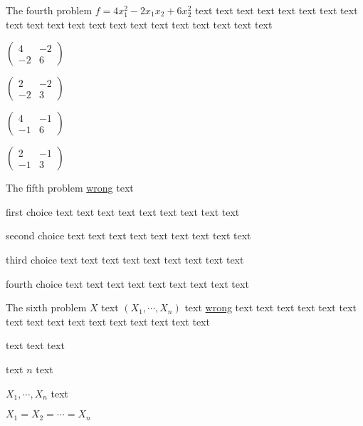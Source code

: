 \documentclass[12pt,most]{randexam}
\begin{document}
\bigskip

\begin{problem}
The fourth problem $f = 4 x_1^2 - 2 x_1 x_2 + 6 x_2^2$ text text text text text text
text text text text text text text text text text text text text text text 
\begin{abcd}
\item $\left(\begin{array}{cc}
  4 & - 2\\
  - 2 & 6
\end{array}\right)$
\item $\left(\begin{array}{cc}
  2 & - 2\\
  - 2 & 3
\end{array}\right)$
\item $\left(\begin{array}{cc}
  4 & - 1\\
  - 1 & 6
\end{array}\right)$
\item $\left(\begin{array}{cc}
  2 & - 1\\
  - 1 & 3
\end{array}\right)$
\end{abcd}
\end{problem}

\bigskip

\begin{problem}
The fifth problem \underline{wrong} text 
\begin{abcd}
\item first choice text text text text text text text text text
\item second choice text text text text text text text text text
\item third choice text text text text text text text text text
\item fourth choice text text text text text text text text text
\end{abcd}
\end{problem}

\bigskip

\begin{problem}
The sixth problem $X$ text $(X_1,\cdots,X_n)$ text \underline{wrong} text text
text text text text text text text text text text text text text text 
\begin{abcd}
\item text text text
\item text $n$ text
\item $X_1, \cdots, X_n$ text
\item $X_1 = X_2 =\cdots = X_n$
\end{abcd}
\end{problem}
\end{document}
